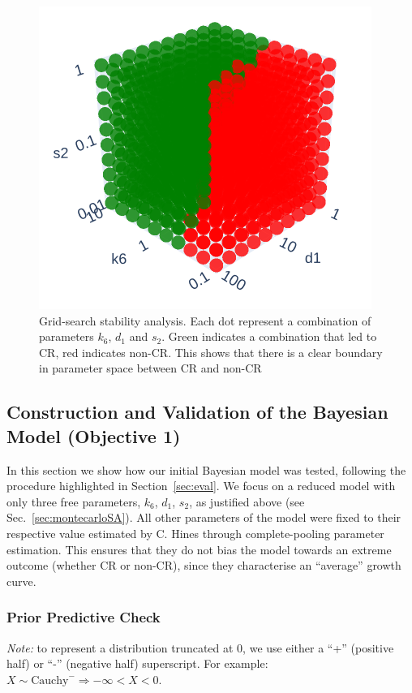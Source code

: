\documentclass[11pt]{article}
\begin{document}
\begin{figure}[!ht]
    \centering\includegraphics[scale=0.5]{stability.png}
    \caption{Grid-search stability analysis. Each dot represent a combination of parameters $k_6$, $d_1$ and $s_2$. Green indicates a combination that led to CR, red indicates non-CR. This shows that there is a clear boundary in parameter space between CR and non-CR}
    \label{fig:mcsa}
\end{figure}

\subsection{Construction and Validation of the Bayesian Model (Objective 1)}
In this section we show how our initial Bayesian model was tested, following the procedure highlighted in Section~\ref{sec:eval}. We focus on a reduced model with only three free parameters, $k_6$, $d_1$, $s_2$, as justified above (see Sec.~\ref{sec:montecarloSA}). All other parameters of the model were fixed to their respective value estimated by C. Hines through complete-pooling parameter estimation. This ensures that they do not bias the model towards an extreme outcome (whether CR or non-CR), since they characterise an ``average'' growth curve.

\subsubsection{Prior Predictive Check}
\textit{Note:} to represent a distribution truncated at 0, we use either a ``+'' (positive half) or ``-'' (negative half) superscript. For example: $X \sim  \text{Cauchy}^- \Rightarrow - \infty < X < 0$.
\end{document}

